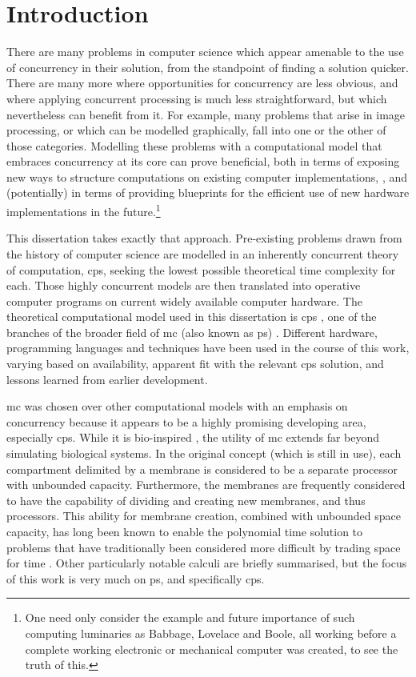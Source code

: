 \chapter{Introduction}

There are many problems in computer science which appear amenable to the use of concurrency in their solution, from the standpoint of finding a solution quicker.  There are many more where opportunities for concurrency are less obvious, and where applying concurrent processing is much less straightforward, but which nevertheless can benefit from it.  For example, many problems that arise in image processing, or which can be modelled graphically, fall into one or the other of those categories.  Modelling these problems with a computational model that embraces concurrency at its core can prove beneficial, both in terms of exposing new ways to structure computations on existing computer implementations, \eg{} \cite{GimelFarb2013a,Nicolescu2014b}, and (potentially) in terms of providing blueprints for the efficient use of new hardware implementations in the future.\footnote{One need only consider the example and future importance of such computing luminaries as Babbage, Lovelace and Boole, all working before a complete working electronic or mechanical computer was created, to see the truth of this.}

This dissertation takes exactly that approach.  Pre-existing problems drawn from the history of computer science are modelled in an inherently concurrent theory of computation, \gls{cps}, seeking the lowest possible theoretical time complexity for each.  Those highly concurrent models are then translated into operative computer programs on current widely available computer hardware.  The theoretical computational model used in this dissertation is \gls{cps} \cite{Nicolescu2018}, one of the branches of the broader field of \gls{mc} (also known as \gls{ps}) \cite{Paun2010b,Paun2002}.  Different hardware, programming languages and techniques have been used in the course of this work, varying based on availability, apparent fit with the relevant \gls{cps} solution, and lessons learned from earlier development.

\Gls{mc} was chosen over other computational models with an emphasis on concurrency because it appears to be a highly promising developing area, especially \gls{cps}.  While it is bio-inspired \cite{Paun2000}, the utility of \gls{mc} extends far beyond simulating biological systems.  In the original concept (which is still in use), each \gls{compartment} delimited by a membrane is considered to be a separate processor with unbounded capacity.  Furthermore, the membranes are frequently considered to have the capability of dividing and creating new membranes, and thus processors.  This ability for membrane creation, combined with unbounded space capacity, has long been known to enable the polynomial time solution to problems that have traditionally been considered more difficult by trading space for time \cite{Paun1999a,Sosik2003}.
Other particularly notable calculi are briefly summarised, but the focus of this work is very much on \gls{ps}, and specifically \gls{cps}.

